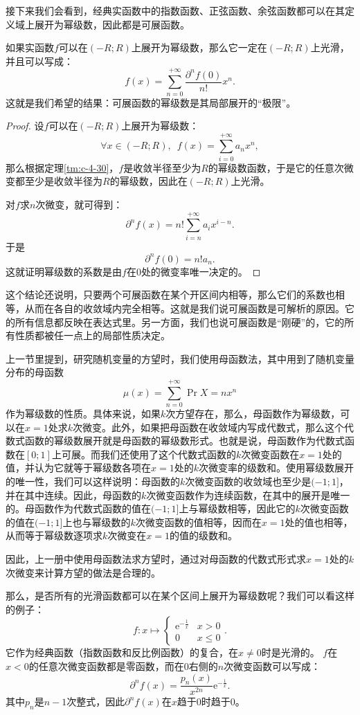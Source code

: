 \documentclass[12pt,UTF8,fontset=none]{ctexbook}
\begin{document}
\begin{appendix}
接下来我们会看到，经典实函数中的指数函数、正弦函数、余弦函数都可以在其定义域上展开为幂级数，因此都是可展函数。

如果实函数$f$可以在$(-R;R)$上展开为幂级数，那么它一定在$(-R;R)$上光滑，并且可以写成：
$$ f(x) = \sum_{n=0}^{+\infty} \frac{\partial^n f(0)}{n!} x^n. $$
这就是我们希望的结果：可展函数的幂级数是其局部展开的“极限”。

\begin{proof}
    设$f$可以在$(-R;R)$上展开为幂级数：
    $$\forall x\in (-R;R),\,\,\, f(x) = \sum_{i=0}^{+\infty} a_n x^n,$$
    那么根据定理\ref{tm:c-4-30}，$f$是收敛半径至少为$R$的幂级数函数，于是它的任意次微变都至少是收敛半径为$R$的幂级数，因此在$(-R;R)$上光滑。

    对$f$求$n$次微变，就可得到：
    $$ \partial^n f(x) = n! \sum_{i=n}^{+\infty} a_i x^{i-n}. $$
    于是
    $$ \partial^n f(0) = n! a_n. $$
    这就证明幂级数的系数是由$f$在$0$处的微变率唯一决定的。
\end{proof}

这个结论还说明，只要两个可展函数在某个开区间内相等，那么它们的系数也相等，从而在各自的收敛域内完全相等。这就是我们说可展函数是可解析的原因。它的所有信息都反映在表达式里。另一方面，我们也说可展函数是“刚硬”的，它的所有性质都被任一点上的局部性质决定。

上一节里提到，研究随机变量的方望时，我们使用母函数法，其中用到了随机变量分布的母函数
$$ \mu(x) = \sum_{n=0}^{+\infty} \Pr{X=n} x^n $$
作为幂级数的性质。具体来说，如果$k$次方望存在，那么，母函数作为幂级数，可以在$x=1$处求$k$次微变。此外，如果把母函数在收敛域内写成代数式，那么这个代数式函数的幂级数展开就是母函数的幂级数形式。也就是说，母函数作为代数式函数在$[0;1]$上可展。而我们还使用了这个代数式函数的$k$次微变函数在$x=1$处的值，并认为它就等于幂级数各项在$x=1$处的$k$次微变率的级数和。使用幂级数展开的唯一性，我们可以这样说明：母函数的$k$次微变函数的收敛域也至少是$(-1;1]$，并在其中连续。因此，母函数的$k$次微变函数作为连续函数，在其中的展开是唯一的。母函数作为代数式函数的值在$(-1;1]$上与幂级数相等，因此它的$k$次微变函数的值在$(-1;1]$上也与幂级数的$k$次微变函数的值相等，因而在$x=1$处的值也相等，从而等于幂级数逐项求$k$次微变在$x=1$的值的级数和。

因此，上一册中使用母函数法求方望时，通过对母函数的代数式形式求$x=1$处的$k$次微变来计算方望的做法是合理的。

那么，是否所有的光滑函数都可以在某个区间上展开为幂级数呢？我们可以看这样的例子：
$$ f: x\mapsto \begin{cases} \mathrm{e}^{-\frac{1}{x}} & x > 0 \\ 0 & x \leqslant 0 \end{cases}.$$
它作为经典函数（指数函数和反比例函数）的复合，在$x\neq 0$时是光滑的。
$f$在$x<0$的任意次微变函数都是零函数，而在$0$右侧的$n$次微变函数可以写成：
$$ \partial^n f(x) = \frac{p_n(x)}{x^{2n}} \mathrm{e}^{-\frac{1}{x}}.$$
其中$p_n$是$n-1$次整式，因此$\partial^n f(x)$在$x$趋于$0$时趋于$0$。


\end{appendix}
\end{document}
